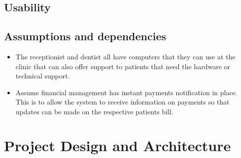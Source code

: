 \documentclass[11 pt]{article}
\begin{document}
\subsection{Usability}
\subsection{Assumptions and dependencies}
\begin{itemize}
\item
The receptionist and dentist all have computers that they can use at the clinic that can also offer support to patients that need the hardware or technical support.
\item
Assume financial management has instant payments notification in place. This is to allow the system to receive information on payments so that updates can be made on the respective patients bill.
\end{itemize}
\newpage
\section{Project Design and Architecture}
\end{document}
